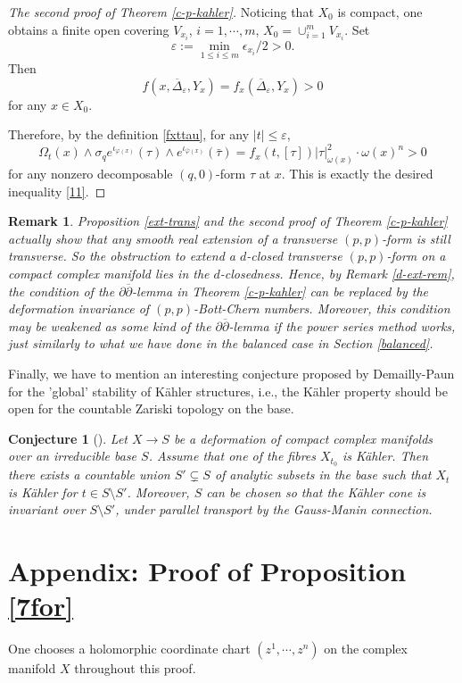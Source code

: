 \documentclass[12pt]{amsart}
\numberwithin{equation}{section}
\newtheorem{remark}  [theorem]     {Remark}
\newtheorem{conjecture}  [theorem]     {Conjecture}
\renewcommand{\1}{\mathds{1}}
\newcommand{\db}{\overline{\partial}}
\renewcommand{\>}{\rightarrow}
\newcommand{\p}{\partial}
\def\p{\partial}
\def\b{\bar}
\begin{document}
\begin{proof}[{The second proof of Theorem \ref{c-p-kahler}}]
Noticing that $X_0$ is compact, one obtains a finite open covering $V_{x_i}$, $i=1,\cdots, m$, $X_0=\cup_{i=1}^m V_{x_i}$. Set
$$\varepsilon:=\min_{1\leq i\leq m}\epsilon_{x_i}/2>0.$$
Then
$$
  f(x,\overline{\Delta}_{\varepsilon},Y_x)=f_x(\overline{\Delta}_{\varepsilon},Y_x)>0
$$
for any $x\in X_0$.


Therefore,  by the definition \eqref{fxttau},
for any $|t|\leq \varepsilon$,
$$
  \Omega_t(x)\wedge \sigma_q e^{\iota_{\varphi(x)}}(\tau)\wedge e^{\iota_{\b{\varphi}(x)}}(\b{\tau})=f_{x}(t,[\tau])|\tau|^2_{\omega(x)}\cdot \omega(x)^n>0
$$
for any nonzero decomposable $(q,0)$-form $\tau$ at $x$. This is exactly the desired inequality \eqref{11}.
\end{proof}

\begin{remark} \label{p-k-rem}
Proposition \ref{ext-trans} and the second proof of Theorem \ref{c-p-kahler} actually show that any smooth real extension of a transverse $(p,p)$-form is still transverse.
So the obstruction to extend a $d$-closed transverse $(p,p)$-form on a compact complex manifold
lies in the $d$-closedness. Hence, by Remark \ref{d-ext-rem}, the condition of the $\p\db$-lemma in Theorem \ref{c-p-kahler} can be replaced by the deformation invariance
of $(p,p)$-Bott-Chern numbers. Moreover, this condition may be weakened as some kind of the $\p\db$-lemma if the power series method works, just similarly to
what we have done in the balanced case in Section \ref{balanced}.
\end{remark}

Finally, we have to mention an interesting conjecture proposed by
Demailly-Paun for the 'global' stability of K\"ahler structures,
i.e., the K\"ahler property should be open for the countable Zariski
topology on the base.
\begin{conjecture}[{\cite[Cojecture 5.1]{DP}}] Let $X\longrightarrow S$ be a
deformation of compact complex manifolds over an irreducible base
$S$. Assume that one of the fibres $X_{t_0}$ is K\"ahler. Then there
exists a countable union $S'\subsetneq S$ of analytic subsets in the
base such that $X_t$ is K\"ahler for $t\in S\setminus S'$. Moreover,
$S$ can be chosen so that the K\"ahler cone is invariant over
$S\setminus S'$, under parallel transport by the Gauss-Manin
connection.
\end{conjecture}

\section{Appendix: Proof of Proposition \ref{7for}}\label{7proof}
One chooses a holomorphic coordinate chart $(z^1,\cdots,z^n)$ on the
complex manifold $X$ throughout this proof.
\end{document}
